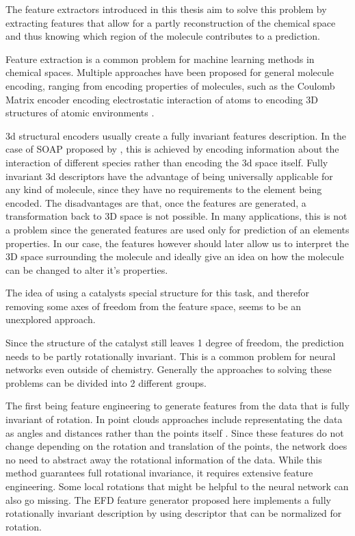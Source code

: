 The feature extractors introduced in this thesis aim to solve this problem by extracting features that allow for a
partly reconstruction of the chemical space and thus knowing which region of the molecule contributes to a prediction.

Feature extraction is a common problem for machine learning methods in chemical spaces.
Multiple approaches have been proposed for general molecule encoding, 
ranging from encoding properties of molecules, such as the Coulomb Matrix encoder encoding electrostatic interaction of atoms \cite{PhysRevLett.108.058301}
to encoding 3D structures of atomic environments \cite{Bart_k_2013}.

3d structural encoders usually create a fully invariant features description.
In the case of SOAP proposed by \citeauthor{Bart_k_2013}, this is achieved by encoding information about the interaction of 
different species rather than encoding the 3d space itself.
Fully invariant 3d descriptors have the advantage of being universally applicable for any kind of molecule, since they have no requirements to the element being encoded.
The disadvantages are that, once the features are generated, a transformation back to 3D space is not possible.
In many applications, this is not a problem since the generated features are used only for prediction of an elements properties.
In our case, the features however should later allow us to interpret the 3D space surrounding the molecule and ideally give an idea on how the molecule can be changed to alter it's properties.

The idea of using a catalysts special structure for this task, and therefor removing some axes of freedom from the feature space, seems to be an unexplored approach.

Since the structure of the catalyst still leaves 1 degree of freedom, the prediction needs to be partly rotationally invariant.
This is a common problem for neural networks even outside of chemistry.
Generally the approaches to solving these problems can be divided into 2 different groups.

The first being feature engineering to generate features from the data that is fully invariant of rotation.
In point clouds approaches include representating the data as angles and distances rather than the points itself \cite{8886052,weiler20183d}.
Since these features do not change depending on the rotation and translation of the points, the network does no need to 
abstract away the rotational information of the data.
While this method guarantees full rotational invariance, it requires extensive feature engineering.
Some local rotations that might be helpful to the neural network can also go missing. %
The EFD feature generator proposed here implements a fully rotationally invariant description by using 
descriptor that can be normalized for rotation.

